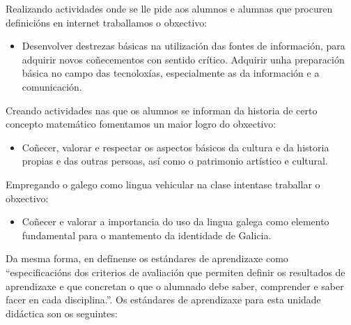 Realizando actividades onde se lle pide aos alumnos e alumnas que procuren definicións en internet traballamos o obxectivo:
\begin{itemize}
    \item Desenvolver destrezas básicas na utilización das fontes de información, para adquirir novos coñecementos con sentido crítico. Adquirir unha preparación básica no campo das tecnoloxías, especialmente as da información e a comunicación.
\end{itemize}

Creando actividades nas que os alumnos se informan da historia de certo concepto matemático fomentamos un maior logro do obxectivo:

\begin{itemize}
    \item Coñecer, valorar e respectar os aspectos básicos da cultura e da historia propias e das outras persoas, así como o patrimonio artístico e cultural.
\end{itemize}

Empregando o galego como lingua vehicular na clase intentase traballar o obxectivo:

\begin{itemize}
    \item Coñecer e valorar a importancia do uso da lingua galega como elemento fundamental para o mantemento da identidade de Galicia.
\end{itemize}

Da mesma forma, en \cite{dogcurrlomce} defínense os estándares de aprendizaxe como ``especificacións dos criterios de avaliación que permiten definir os resultados de aprendizaxe e que concretan o que o alumnado debe saber, comprender e saber facer en cada disciplina.''.  Os estándares de aprendizaxe para esta unidade didáctica son os seguintes:

